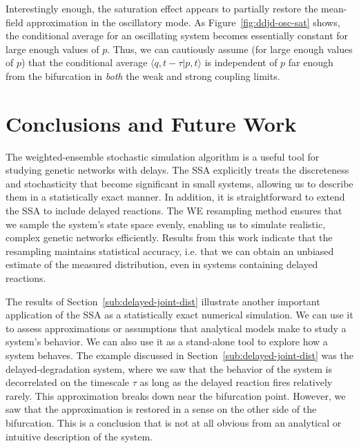\documentclass[english,letterpaper,12pt]{report}
\begin{document}
\begin{doublespacing}
Interestingly enough, the saturation effect appears to partially restore the mean-field approximation in the oscillatory mode. As Figure~\ref{fig:ddjd-osc-sat} shows, the conditional average for an oscillating system becomes essentially constant for large enough values of $p$. Thus, we can cautiously assume (for large enough values of $p$) that the conditional average $\langle q, t - \tau | p, t \rangle$ is independent of $p$ far enough from the bifurcation in \emph{both} the weak and strong coupling limits.



\chapter{Conclusions and Future Work} %
\label{sec:conclusions}

The weighted-ensemble stochastic simulation algorithm is a useful tool for studying genetic networks with delays. The SSA explicitly treats the discreteness and stochasticity that become significant in small systems, allowing us to describe them in a statistically exact manner. In addition, it is straightforward to extend the SSA to include delayed reactions. The WE resampling method ensures that we sample the system's state space evenly, enabling us to simulate realistic, complex genetic networks efficiently. Results from this work indicate that the resampling maintains statistical accuracy, i.e. that we can obtain an unbiased estimate of the measured distribution, even in systems containing delayed reactions.

The results of Section~\ref{sub:delayed-joint-dist} illustrate another important application of the SSA as a statistically exact numerical simulation. We can use it to assess approximations or assumptions that analytical models make to study a system's behavior. We can also use it as a stand-alone tool to explore how a system behaves. The example discussed in Section~\ref{sub:delayed-joint-dist} was the delayed-degradation system, where we saw that the behavior of the system is decorrelated on the timescale $\tau$ as long as the delayed reaction fires relatively rarely. This approximation breaks down near the bifurcation point. However, we saw that the approximation is restored in a sense on the other side of the bifurcation. This is a conclusion that is not at all obvious from an analytical or intuitive description of the system.


\end{doublespacing}
\end{document}
